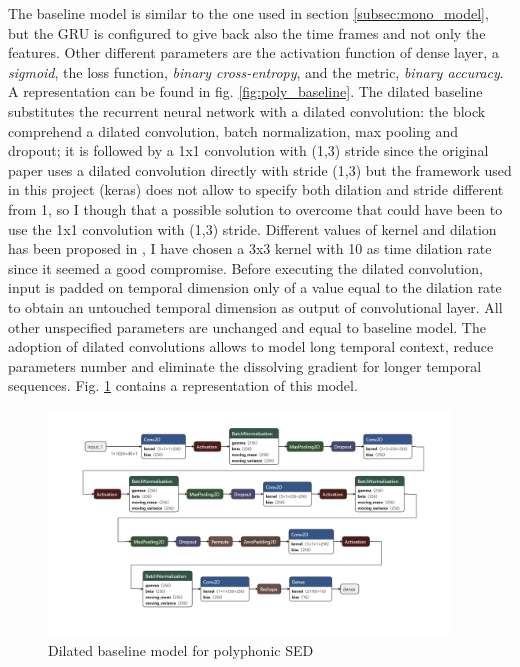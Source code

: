 \documentclass{article}
\begin{document}
The baseline model is similar to the one used in section \ref{subsec:mono_model}, but the GRU is configured to give back also the time frames and not only the features. Other different parameters are the activation function of dense layer, a \textit{sigmoid}, the loss function, \textit{binary cross-entropy}, and the metric, \textit{binary accuracy}. A representation can be found in fig. \ref{fig:poly_baseline}.\newline
The dilated baseline substitutes the recurrent neural network with a dilated convolution: the block comprehend a dilated convolution, batch normalization, max pooling and dropout; it is followed by a 1x1 convolution with (1,3) stride since the original paper \cite{drossos2020sound} uses a dilated convolution directly with stride (1,3) but the framework used in this project (keras) does not allow to specify both dilation and stride different from 1, so I though that a possible solution to overcome that could have been to use the 1x1 convolution with (1,3) stride. \newline
Different values of kernel and dilation has been proposed in \cite{drossos2020sound}, I have chosen a 3x3 kernel with 10 as time dilation rate since it seemed a good compromise. Before executing the dilated convolution, input is padded on temporal dimension only of a value equal to the dilation rate to obtain an untouched temporal dimension as output of convolutional layer. All other unspecified parameters are unchanged and equal to baseline model. The adoption of dilated convolutions allows to model long temporal context, reduce parameters number and eliminate the dissolving gradient for longer temporal sequences. Fig. \ref{fig:poly_dilated} contains a representation of this model.

\begin{figure}[H]
	\centering
	\includegraphics[width=0.95\textwidth]{./images/poly/dilated.png}	
	\caption{Dilated baseline model for polyphonic SED}
	\label{fig:poly_dilated}
\end{figure}
\end{document}
